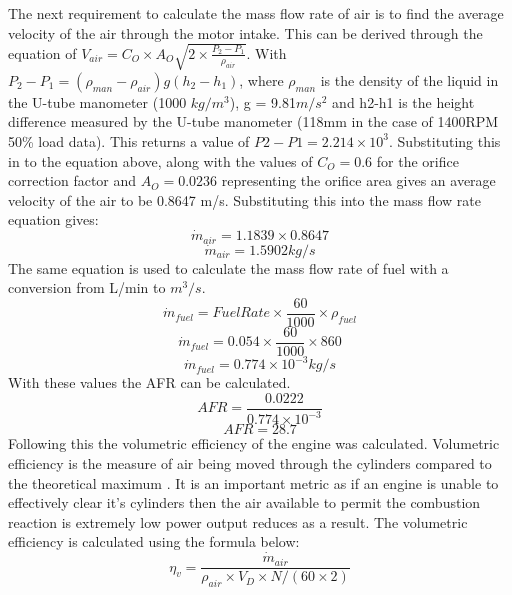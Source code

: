 \documentclass[12pt]{article}
\begin{document}
\par
The next requirement to calculate the mass flow rate of air is to find the average velocity of the air through the motor intake. This can be derived through the equation of $V_{air} = C_O\times A_O \sqrt{2\times \frac{P_2-P_1}{\rho_{air}}}$. With $P_2-P_1 = (\rho_{man}-\rho_{air})g(h_2-h_1)$, where $\rho_{man}$ is the density of the liquid in the U-tube manometer (1000 $kg/m^3$), g = 9.81$m/s^2$ and h2-h1 is the height difference measured by the U-tube manometer (118mm in the case of 1400RPM 50\% load data). This returns a value of $P2-P1 = 2.214\times 10^3$. Substituting this in to the equation above, along with the values of $C_O = 0.6$ for the orifice correction factor and $A_O = 0.0236$ representing the orifice area gives an average velocity of the air to be 0.8647 m/s. Substituting this into the mass flow rate equation gives:
\begin{equation*}
\dot{m}_{air} = 1.1839\times0.8647
\end{equation*}
\begin{equation*}
\dot{m}_{air} = 1.5902 kg/s
\end{equation*}
The same equation is used to calculate the mass flow rate of fuel with a conversion from L/min to $m^3/s$.
\begin{equation*}
    \dot{m}_{fuel} = Fuel Rate\times\frac{60}{1000} \times \rho_{fuel}
\end{equation*}
\begin{equation*}
    \dot{m}_{fuel} = 0.054\times\frac{60}{1000} \times860
\end{equation*}
\begin{equation*}
    \dot{m}_{fuel} = 0.774\times 10^{-3} kg/s
\end{equation*}
With these values the AFR can be calculated.
\begin{equation*}
    AFR = \frac{0.0222}{0.774\times10^{-3}}
\end{equation*}
\begin{equation*}
    AFR = 28.7
\end{equation*}
Following this the volumetric efficiency of the engine was calculated. Volumetric efficiency is the measure of air being moved through the cylinders compared to the theoretical maximum \cite{DENICOLA}. It is an important metric as if an engine is unable to effectively clear it's cylinders then the air available to permit the combustion reaction is extremely low power output reduces as a result. The volumetric efficiency is calculated using the formula below:
\begin{equation}
    \eta_{v} = \frac{\dot{m}_{air}}{\rho_{air}\times V_D \times N/(60\times2)}
\end{equation}
\end{document}
